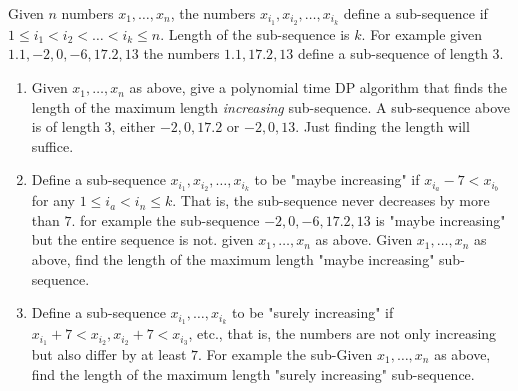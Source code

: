 \documentclass[11pt]{article}
\theoremstyle{numberplain}
\theoremstyle{nonumberplain}
\newcommand{\0}{{\mathbf{0}}}
\begin{document}
\begin{ques}[2015 midterm 2] Given $n$ numbers $x_1,\ldots,x_n$, the numbers $x_{i_1},x_{i_2},\ldots,x_{i_k}$ define a sub-sequence if $1\leq i_1<i_2<\ldots<i_k\leq n$. Length of the sub-sequence is $k$. For example given $1.1,-2,0,-6,17.2,13$ the numbers $1.1, 17.2, 13$ define a sub-sequence of length $3$.
\begin{enumerate}
\item Given $x_1,\ldots, x_n$ as above, give a polynomial time DP algorithm that finds the length of the maximum length \textit{increasing} sub-sequence. A sub-sequence above is of length $3$, either $-2,0,17.2$ or $-2,0,13$. Just finding the length will suffice.
\item Define a sub-sequence $x_{i_1},x_{i_2},\ldots,x_{i_k}$ to be "maybe increasing" if $x_{i_a}-7<x_{i_b}$ for any $1\leq i_a<i_n\leq k$. That is, the sub-sequence never decreases by more than $7$. for example the sub-sequence $-2,0,-6,17.2,13$ is "maybe increasing" but the entire sequence is not. given $x_1,\ldots,x_n$ as above. Given $x_1,\ldots,x_n$ as above, find the length of the maximum length "maybe increasing" sub-sequence.

\item Define a sub-sequence $x_{i_1},\ldots,x_{i_k}$ to be "surely increasing" if $x_{i_1}+7<x_{i_2},x_{i_2}+7<x_{i_3}$, etc., that is, the numbers are not only increasing but also differ by at least $7$. For example the sub-Given $x_1,\ldots,x_n$ as above, find the length of the maximum length "surely increasing" sub-sequence.
\end{enumerate}
\end{ques}
\end{document}
